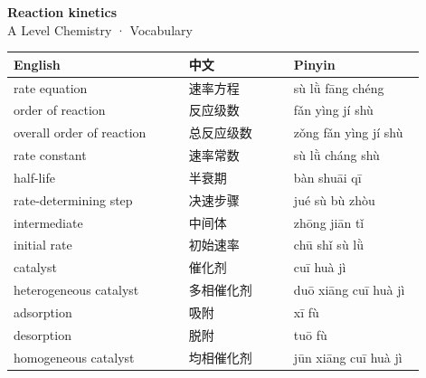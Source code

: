 \documentclass[11pt]{article}
\begin{document}
\begin{center}
  {\LARGE\bfseries Reaction kinetics}\\[0.35em]
  {\large A Level Chemistry · Vocabulary}
\end{center}
\vspace{0.6em}

\begin{longtable}{@{}p{0.40\linewidth}p{0.24\linewidth}p{0.30\linewidth}@{}}
\toprule
\textbf{English} & \textbf{中文} & \textbf{Pinyin} \\
\midrule
\endhead
\bottomrule
\endlastfoot
rate equation & 速率方程 & sù lǜ fāng chéng \\
order of reaction & 反应级数 & fǎn yìng jí shù \\
overall order of reaction & 总反应级数 & zǒng fǎn yìng jí shù \\
rate constant & 速率常数 & sù lǜ cháng shù \\
half-life & 半衰期 & bàn shuāi qī \\
rate-determining step & 决速步骤 & jué sù bù zhòu \\
intermediate & 中间体 & zhōng jiān tǐ \\
initial rate & 初始速率 & chū shǐ sù lǜ \\
catalyst & 催化剂 & cuī huà jì \\
heterogeneous catalyst & 多相催化剂 & duō xiāng cuī huà jì \\
adsorption & 吸附 & xī fù \\
desorption & 脱附 & tuō fù \\
homogeneous catalyst & 均相催化剂 & jūn xiāng cuī huà jì \\
\end{longtable}
\end{document}
